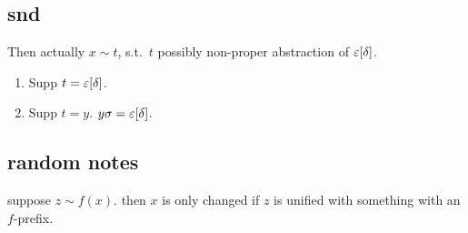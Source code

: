 \documentclass[,%
	paper=a4,%
	DIV11, %
	twoside=false,%
	liststotoc,
	bibtotoc,
	draft=false,%
	numbers=noendperiod
]{scrartcl}
\begin{document}
\subsection{snd}

Then actually $x \sim t$, s.t.\ $t$ possibly non-proper abstraction of $\varepsilon[\delta]$.

\begin{enumerate}
	\item Supp $t = \varepsilon[\delta]$. \checkmark
	\item Supp $t = y$.
		$y\sigma = \varepsilon[\delta]$.
\end{enumerate}

\subsection{random notes}

suppose $z\sim f(x)$.
then $x$ is only changed if $z$ is unified with something with an $f$-prefix.



\end{document}
